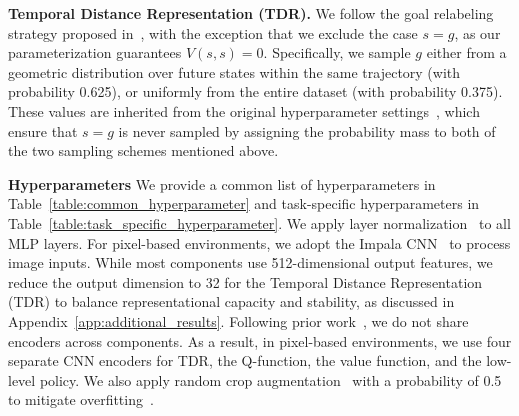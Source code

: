 \documentclass{article}
\begin{document}
\vspace{0.5em}

\textbf{Temporal Distance Representation (TDR).}
We follow the goal relabeling strategy proposed in~\cite{andrychowicz2017hindsight, park2023hiql, park2024foundation}, with the exception that we exclude the case $s = g$, as our parameterization guarantees $V(s, s) = 0$. Specifically, we sample $g$ either from a geometric distribution over future states within the same trajectory (with probability 0.625), or uniformly from the entire dataset (with probability 0.375). These values are inherited from the original hyperparameter settings~\cite{park2024foundation}, which ensure that $s = g$ is never sampled by assigning the probability mass to both of the two sampling schemes mentioned above.

\vspace{0.5em}

\textbf{Hyperparameters} We provide a common list of hyperparameters in Table~\ref{table:common_hyperparameter} and task-specific hyperparameters in Table~\ref{table:task_specific_hyperparameter}. We apply layer normalization~\cite{layernorm} to all MLP layers. For pixel-based environments, we adopt the Impala CNN~\cite{espeholt2018impala} to process image inputs. While most components use 512-dimensional output features, we reduce the output dimension to 32 for the Temporal Distance Representation (TDR) to balance representational capacity and stability, as discussed in Appendix~\ref{app:additional_results}. Following prior work~\cite{park2023hiql, park2024foundation, park2025ogbench}, we do not share encoders across components. As a result, in pixel-based environments, we use four separate CNN encoders for TDR, the Q-function, the value function, and the low-level policy. We also apply random crop augmentation~\cite{kostrikov2021image} with a probability of 0.5 to mitigate overfitting~\cite{zheng2024stabilizing}.

\vspace{0.5em}
\end{document}
